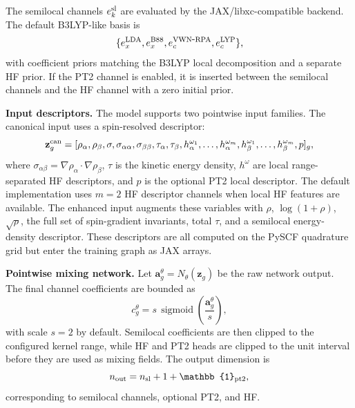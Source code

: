 The semilocal channels $e_k^{\rm sl}$ are evaluated by the
JAX/libxc-compatible backend. The default B3LYP-like basis is
\begin{equation}
  \{e_x^{\rm LDA}, e_x^{\rm B88},
    e_c^{\rm VWN\mbox{-}RPA}, e_c^{\rm LYP}\},
  \label{eq:default-basis}
\end{equation}
with coefficient priors matching the B3LYP local decomposition and
a separate HF prior. If the PT2 channel is enabled, it is inserted
between the semilocal channels and the HF channel with a zero
initial prior.

\textbf{Input descriptors.} The model supports two pointwise input
families. The canonical input uses a spin-resolved descriptor:
\begin{equation}
  \mathbf{z}_g^{\rm can}
  =
  [
  \rho_{\alpha},\rho_{\beta},
  \sigma,\sigma_{\alpha\alpha},\sigma_{\beta\beta},
  \tau_{\alpha},\tau_{\beta},
  h_{\alpha}^{\omega_1},\ldots,h_{\alpha}^{\omega_m},
  h_{\beta}^{\omega_1},\ldots,h_{\beta}^{\omega_m},
  p
  ]_g,
  \label{eq:canonical-input}
\end{equation}
where $\sigma_{\alpha\beta}=\nabla\rho_\alpha\cdot\nabla\rho_\beta$,
$\tau$ is the kinetic energy density, $h^\omega$ are local
range-separated HF descriptors, and $p$ is the optional PT2 local
descriptor. The default implementation uses $m=2$ HF descriptor
channels when local HF features are available. The enhanced input
augments these variables with $\rho$, $\log(1+\rho)$, $\sqrt{\rho}$,
the full set of spin-gradient invariants, total $\tau$, and a
semilocal energy-density descriptor. These descriptors are all
computed on the PySCF quadrature grid but enter the training graph as
JAX arrays.

\textbf{Pointwise mixing network.} Let
$\mathbf{a}_g^{\theta}=N_\theta(\mathbf{z}_g)$ be the raw network
output. The final channel coefficients are bounded as
\begin{equation}
  c_g^{\theta} = s\,\operatorname{sigmoid}
  \left(\frac{\mathbf{a}_g^{\theta}}{s}\right),
  \label{eq:coefficient-transform}
\end{equation}
with scale $s=2$ by default. Semilocal coefficients are then clipped
to the configured kernel range, while HF and PT2 heads are clipped to
the unit interval before they are used as mixing fields. The output
dimension is
\begin{equation}
  n_{\rm out}=n_{\rm sl}+1+\mathbb{1}_{\rm pt2},
  \label{eq:output-dim}
\end{equation}
corresponding to semilocal channels, optional PT2, and HF.

